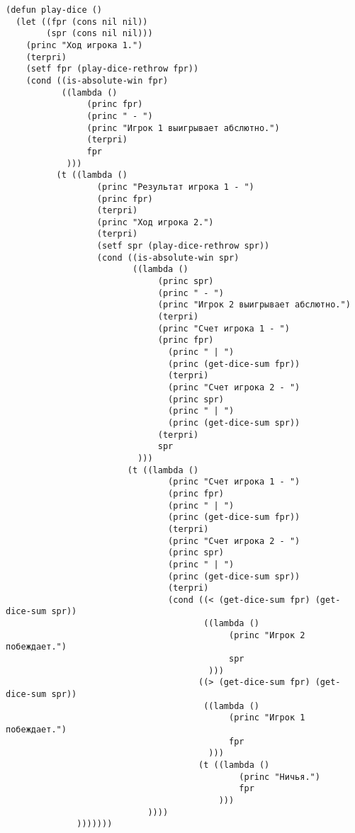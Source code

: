 \documentclass[a4paper,oneside,14pt]{extarticle}
\begin{document}
\begin{lstlisting}
(defun play-dice ()
  (let ((fpr (cons nil nil))
        (spr (cons nil nil)))
    (princ "Ход игрока 1.")
    (terpri)
    (setf fpr (play-dice-rethrow fpr))
    (cond ((is-absolute-win fpr)
           ((lambda ()
                (princ fpr)
                (princ " - ")
                (princ "Игрок 1 выигрывает абслютно.")
                (terpri)
                fpr
            )))
          (t ((lambda ()
                  (princ "Результат игрока 1 - ")
                  (princ fpr)
                  (terpri)
                  (princ "Ход игрока 2.")
                  (terpri)
                  (setf spr (play-dice-rethrow spr))
                  (cond ((is-absolute-win spr)
                         ((lambda ()
                              (princ spr)
                              (princ " - ")
                              (princ "Игрок 2 выигрывает абслютно.")
                              (terpri)
                              (princ "Счет игрока 1 - ")
                              (princ fpr)
                                (princ " | ")
                                (princ (get-dice-sum fpr))
                                (terpri)
                                (princ "Счет игрока 2 - ")
                                (princ spr)
                                (princ " | ")
                                (princ (get-dice-sum spr))
                              (terpri)
                              spr
                          )))
                        (t ((lambda ()
                                (princ "Счет игрока 1 - ")
                                (princ fpr)
                                (princ " | ")
                                (princ (get-dice-sum fpr))
                                (terpri)
                                (princ "Счет игрока 2 - ")
                                (princ spr)
                                (princ " | ")
                                (princ (get-dice-sum spr))
                                (terpri)
                                (cond ((< (get-dice-sum fpr) (get-dice-sum spr))
                                       ((lambda ()
                                            (princ "Игрок 2 побеждает.")
                                            spr
                                        )))
                                      ((> (get-dice-sum fpr) (get-dice-sum spr))
                                       ((lambda ()
                                            (princ "Игрок 1 побеждает.")
                                            fpr
                                        )))
                                      (t ((lambda ()
                                              (princ "Ничья.")
                                              fpr
                                          )))
                            ))))
              )))))))
\end{lstlisting}
\end{document}
